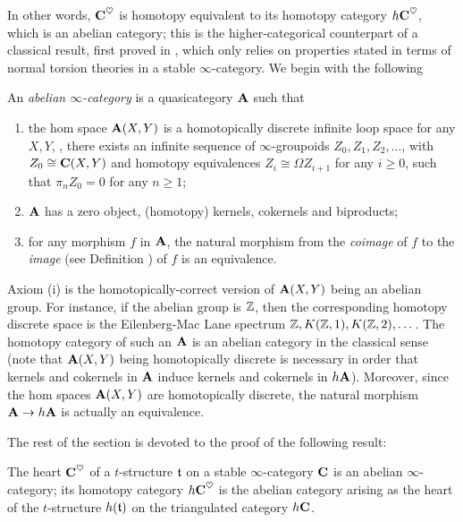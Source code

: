 In other words, $\textbf{C}^\heartsuit$ is homotopy equivalent to its homotopy category $h\textbf{C}^\heartsuit$, which is an abelian category; this is the higher\hyp{}categorical counterpart of a classical result, first proved in \cite[Thm. \textbf{1.3.6}]{BBDPervers}, 
which 
only relies on properties stated in terms of normal torsion theories in a stable $\infty$\hyp{}category. We begin with the following
\begin{definition}\label{df:abelinfty}
An \emph{abelian $\infty$\hyp{}category} is a quasicategory $\textbf{A}$ such that
\begin{enumerate}
\item the hom space $\textbf{A}(X,Y)$ is a homotopically discrete infinite loop space for any $X, Y$, \ie, there exists an infinite sequence of $\infty$\hyp{}groupoids $Z_0, Z_1,Z_2,\dots$, with $Z_0\cong \textbf{C}(X,Y)$ and homotopy equivalences $Z_i\cong \Omega Z_{i+1}$ for any $i\geq 0$, such that $\pi_n Z_0=0$ for any $n\geq 1$;
\item $\textbf{A}$ has a zero object, (homotopy) kernels, cokernels and biproducts;
\item for any morphism $f$ in $\textbf{A}$, the natural morphism from the \emph{coimage} of $f$ to the \emph{image} (see Definition ) of $f$ is an equivalence.
\end{enumerate}
\end{definition}
\begin{remark}
Axiom (i) is the homotopically\hyp{}correct version of $\textbf{A}(X,Y)$ being an abelian group. For instance, if the abelian group is $\mathbb{Z} $, then the corresponding homotopy discrete space is the Eilenberg\hyp{}Mac Lane spectrum $\mathbb{Z} ,K(\mathbb{Z} ,1), K(\mathbb{Z} ,2),\dots$. The homotopy category of such an $\textbf{A}$ is an abelian category in the classical sense (note that $\textbf{A}(X,Y)$ being homotopically discrete is necessary in order that kernels and cokernels in $\textbf{A}$ induce kernels and cokernels in $h\textbf{A}$). Moreover, since the hom spaces $\textbf{A}(X,Y)$ are homotopically discrete, the natural morphism $\textbf{A}\to h\textbf{A}$ is actually an equivalence.
\end{remark}
The rest of the section is devoted to the proof of the following result:
\begin{theorem}\label{heart.is.abelian}
The heart $\textbf{C}^\heartsuit$ of a $t$\hyp{}structure $\mathfrak{t}$ on a stable $\infty$\hyp{}category $\textbf{C}$ is an abelian $\infty$\hyp{}category; its homotopy category $h\textbf{C}^\heartsuit$ is the abelian category arising as the heart of the $t$\hyp{}structure $h(\mathfrak{t})$ on the triangulated category $h\textbf{C}$.
\end{theorem}
